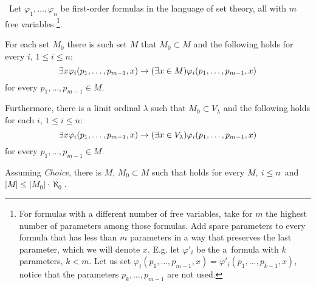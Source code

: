 \begin{lemma}\label{lemma:reflection_lemma}\
Let $\varphi_1, \ldots, \varphi_n$ be first-order formulas in the language of set theory, all with $m$ free variables
\footnote{For formulas with a different number of free variables, take for $m$ the highest number of parameters among those formulas. Add spare parameters to every formula that has less than $m$ parameters in a way that preserves the last parameter, which we will denote $x$.
E.g. let $\varphi'_i$ be the a~formula with $k$ parameters, $k < m$. Let us set $\varphi_i(p_1, \ldots, p_{m-1}, x) = \varphi'_i(p_1, \ldots, p_{k-1}, x)$, notice that the parameters $p_k, \ldots, p_{m-1}$ are not used.}.
\bce[(i)]
\item For each set $M_0$ there is such set $M$ that $M_0 \subset M$ and the following holds for every $i$, $1 \leq i \leq n$:
\begin{equation}\label{equation:refl_lemma_i}
\exists x \varphi_i(p_1, \ldots, p_{m-1}, x) \rightarrow (\exists x \in M) \varphi_i(p_1, \ldots, p_{m-1}, x)
\end{equation}
for every $p_1, \ldots, p_{m-1} \in M$.

\item Furthermore, there is a limit ordinal $\lambda$ such that $M_0 \subset V_\lambda$ and the following holds for each $i$, $1 \leq i \leq n$:
\begin{equation}\label{equation:refl_lemma_ii}
\exists x \varphi_i(p_1, \ldots, p_{m-1}, x) \rightarrow (\exists x \in V_\lambda) \varphi_i(p_1, \ldots, p_{m-1}, x)
\end{equation}
for every $p_1, \ldots, p_{m-1} \in M$.

\item Assuming \emph{Choice}, there is $M$, $M_0 \subset M$ such that  holds for every $M,\ i \leq n$ and $|M| \leq |M_0| \cdot \aleph_0$.
\ece
\end{lemma}

